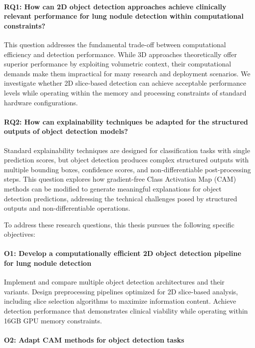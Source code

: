 \paragraph{RQ1: How can 2D object detection approaches achieve clinically relevant performance for lung nodule detection within computational constraints?}
This question addresses the fundamental trade-off between computational efficiency and detection performance. While 3D approaches theoretically offer superior performance by exploiting volumetric context, their computational demands make them impractical for many research and deployment scenarios. We investigate whether 2D slice-based detection can achieve acceptable performance levels while operating within the memory and processing constraints of standard hardware configurations.

\paragraph{RQ2: How can explainability techniques be adapted for the structured outputs of object detection models?}
Standard explainability techniques are designed for classification tasks with single prediction scores, but object detection produces complex structured outputs with multiple bounding boxes, confidence scores, and non-differentiable post-processing steps. This question explores how gradient-free Class Activation Map (CAM) methods can be modified to generate meaningful explanations for object detection predictions, addressing the technical challenges posed by structured outputs and non-differentiable operations.\bigskip

To address these research questions, this thesis pursues the following specific objectives:
\paragraph{O1: Develop a computationally efficient 2D object detection pipeline for lung nodule detection}
Implement and compare multiple object detection architectures and their variants.
Design preprocessing pipelines optimized for 2D slice-based analysis, including slice selection algorithms to maximize information content.
Achieve detection performance that demonstrates clinical viability while operating within 16GB GPU memory constraints.

\paragraph{O2: Adapt CAM methods for object detection tasks }

